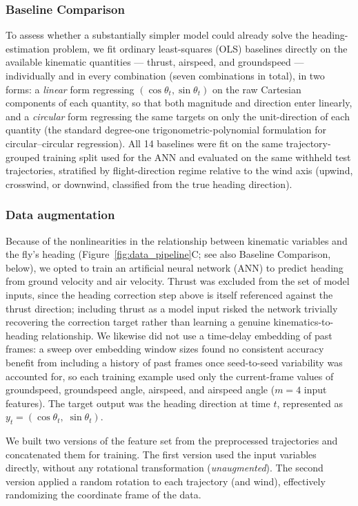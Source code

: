 \documentclass[11pt]{article}
\begin{document}
\subsubsection*{Baseline Comparison}
To assess whether a substantially simpler model could already solve the heading-estimation problem, we fit ordinary least-squares (OLS) baselines directly on the available kinematic quantities --- thrust, airspeed, and groundspeed --- individually and in every combination (seven combinations in total), in two forms: a \textit{linear} form regressing $(\cos\theta_t,\sin\theta_t)$ on the raw Cartesian components of each quantity, so that both magnitude and direction enter linearly, and a \textit{circular} form regressing the same targets on only the unit-direction of each quantity (the standard degree-one trigonometric-polynomial formulation for circular--circular regression). All 14 baselines were fit on the same trajectory-grouped training split used for the ANN and evaluated on the same withheld test trajectories, stratified by flight-direction regime relative to the wind axis (upwind, crosswind, or downwind, classified from the true heading direction).

\subsubsection*{Data augmentation}
Because of the nonlinearities in the relationship between kinematic variables and the fly's heading (Figure~\ref{fig:data_pipeline}C; see also Baseline Comparison, below), we opted to train an artificial neural network (ANN) to predict heading from ground velocity and air velocity. Thrust was excluded from the set of model inputs, since the heading correction step above is itself referenced against the thrust direction; including thrust as a model input risked the network trivially recovering the correction target rather than learning a genuine kinematics-to-heading relationship. We likewise did not use a time-delay embedding of past frames: a sweep over embedding window sizes found no consistent accuracy benefit from including a history of past frames once seed-to-seed variability was accounted for, so each training example used only the current-frame values of groundspeed, groundspeed angle, airspeed, and airspeed angle ($m = 4$ input features). The target output was the heading direction at time $t$, represented as $y_t = (\cos\theta_t,\; \sin\theta_t)$.

We built two versions of the feature set from the preprocessed trajectories and concatenated them for training. The first version used the input variables directly, without any rotational transformation (\textit{unaugmented}). The second version applied a random rotation to each trajectory (and wind), effectively randomizing the coordinate frame of the data.
\end{document}
